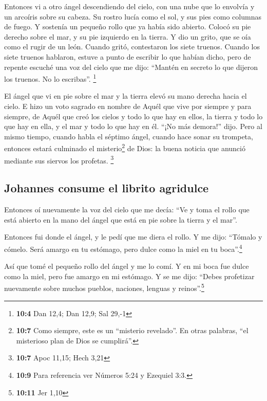  Entonces vi a otro ángel descendiendo del cielo, con una
nube que lo envolvía y un arcoíris sobre su cabeza. Su rostro lucía como
el sol, y sus pies como columnas de fuego.  Y sostenía un
pequeño rollo que ya había sido abierto. Colocó su pie derecho sobre el
mar, y su pie izquierdo en la tierra.  Y dio un grito, que
se oía como el rugir de un león. Cuando gritó, contestaron los siete
truenos.  Cuando los siete truenos hablaron, estuve a
punto de escribir lo que habían dicho, pero de repente escuché una voz
del cielo que me dijo: ``Mantén en secreto lo que dijeron los truenos.
No lo escribas''. \footnote{\textbf{10:4} Dan 12,4; Dan 12,9; Sal 29,-1}

 El ángel que vi en pie sobre el mar y la tierra elevó su
mano derecha hacia el cielo.  E hizo un voto sagrado en
nombre de Aquél que vive por siempre y para siempre, de Aquél que creó
los cielos y todo lo que hay en ellos, la tierra y todo lo que hay en
ella, y el mar y todo lo que hay en él. ``¡No más demora!'' dijo.
 Pero al mismo tiempo, cuando habla el séptimo ángel,
cuando hace sonar su trompeta, entonces estará culminado el
misterio\footnote{\textbf{10:7} Como siempre, este es un ``misterio
  revelado''. En otras palabras, ``el misterioso plan de Dios se
  cumplirá''.} de Dios: la buena noticia que anunció mediante sus
siervos los profetas. \footnote{\textbf{10:7} Apoc 11,15; Hech 3,21}

\hypertarget{johannes-consume-el-librito-agridulce}{%
\subsection{Johannes consume el librito
agridulce}\label{johannes-consume-el-librito-agridulce}}

 Entonces oí nuevamente la voz del cielo que me decía:
``Ve y toma el rollo que está abierto en la mano del ángel que está en
pie sobre la tierra y el mar''.

 Entonces fui donde el ángel, y le pedí que me diera el
rollo. Y me dijo: ``Tómalo y cómelo. Será amargo en tu estómago, pero
dulce como la miel en tu boca''.\footnote{\textbf{10:9} Para referencia
  ver Números 5:24 y Ezequiel 3:3.}

 Así que tomé el pequeño rollo del ángel y me lo comí. Y
en mi boca fue dulce como la miel, pero fue amargo en mi estómago.
 Y se me dijo: ``Debes profetizar nuevamente sobre muchos
pueblos, naciones, lenguas y reinos''.\footnote{\textbf{10:11} Jer 1,10}

